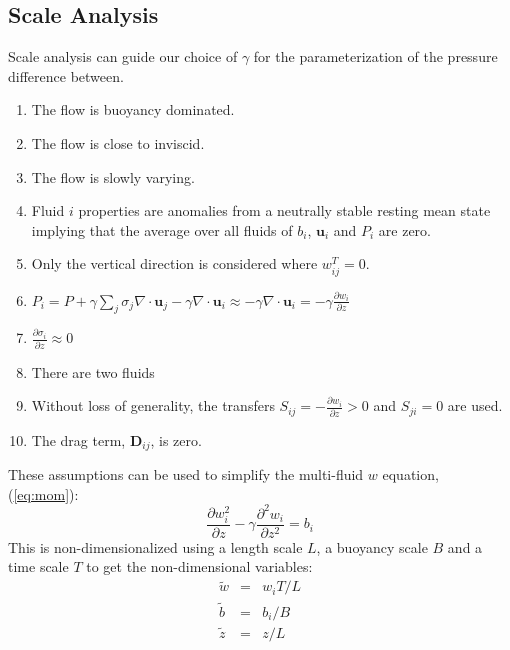 \documentclass[draft]{agujournal2019}
\begin{document}
\subsection{\label{subsec:dimAnal}Scale
 Analysis}

Scale analysis can guide our choice of $\gamma$ for the parameterization of the pressure difference between.  
\begin{enumerate}
\item The flow is buoyancy dominated.
\item The flow is close to inviscid.
\item The flow is slowly varying.
\item Fluid $i$ properties are anomalies from a neutrally stable resting
mean state 
implying that the average over all fluids of $b_i$, $\mathbf{u}_i$ and $P_i$ are zero.
\item Only the vertical direction is considered where $w_{ij}^{T}=0$.
\item $P_{i} = P + \gamma\sum_j \sigma_j\nabla\cdot\mathbf{u}_j 
                              - \gamma\nabla\cdot\mathbf{u}_{i}
             \approx-\gamma\nabla\cdot\mathbf{u}_{i}
            =-\gamma\frac{\partial w_{i}}{\partial z}$
\item $\frac{\partial \sigma_i}{\partial z} \approx 0$
\item There are two fluids 
\item Without loss of generality, the transfers $S_{ij}=-\frac{\partial w_{i}}{\partial z}>0$
and $S_{ji}=0$ are used.
\item The drag term, $\mathbf{D}_{ij}$, is zero.
\end{enumerate}
These assumptions can be used to simplify the multi-fluid $w$ equation, ({\protect\ref{eq:mom})}:
\begin{equation}
\frac{\partial w_{i}^{2}}{\partial z}-\gamma\frac{\partial^{2}w_{i}}{\partial z^{2}}=b_{i}\label{eq:wi_balances}
\end{equation}
This is non-dimensionalized using a length scale $L$, a buoyancy scale
$B$ and a time scale $T$ to get the non-dimensional variables:
\begin{eqnarray*}
\tilde{w} & = & w_{i}T/L\\
\tilde{b} & = & b_{i}/B\\
\tilde{z} & = & z/L
\end{eqnarray*}
\end{document}
